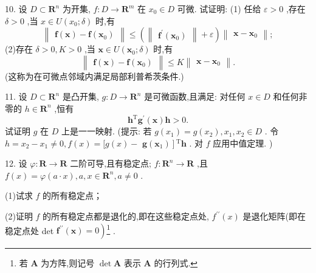 10. 设 \(D \subset  {\mathbf{R}}^{n}\) 为开集, \(f : D \rightarrow  {\mathbf{R}}^{m}\) 在 \({x}_{0} \in  D\) 可微. 试证明: (1) 任给 \(\varepsilon  > 0\) ,存在 \(\delta  > 0\) ,当 \(x \in  U\left( {{x}_{0};\delta }\right)\) 时,有
\[
\begin{Vmatrix}{\mathbf{f}\left( \mathbf{x}\right)  - \mathbf{f}\left( {\mathbf{x}}_{0}\right) }\end{Vmatrix} \leq  \left( {\begin{Vmatrix}{{\mathbf{f}}^{\prime }\left( {\mathbf{x}}_{0}\right) }\end{Vmatrix} + \varepsilon }\right) \begin{Vmatrix}{\mathbf{x} - {\mathbf{x}}_{0}}\end{Vmatrix};
\]
(2)存在 \(\delta  > 0,K > 0\) ,当 \(\mathbf{x} \in  U\left( {{\mathbf{x}}_{0};\delta }\right)\) 时,有
\[
\begin{Vmatrix}{\mathbf{f}\left( \mathbf{x}\right)  - \mathbf{f}\left( {\mathbf{x}}_{0}\right) }\end{Vmatrix} \leq  K\begin{Vmatrix}{\mathbf{x} - {\mathbf{x}}_{0}}\end{Vmatrix}.
\]
(这称为在可微点邻域内满足局部利普希茨条件.)

11. 设 \(D \subset  {\mathbf{R}}^{n}\) 是凸开集, \(g : D \rightarrow  {\mathbf{R}}^{n}\) 是可微函数,且满足: 对任何 \(x \in  D\) 和任何非零的 \(h \in  {\mathbf{R}}^{n}\) ,恒有
\[
{\mathbf{h}}^{\mathrm{T}}{\mathbf{g}}^{\prime }\left( \mathbf{x}\right) \mathbf{h} > 0.
\]
试证明 \(g\) 在 \(D\) 上是一一映射. (提示: 若 \(g\left( {x}_{1}\right)  = g\left( {x}_{2}\right) ,{x}_{1},{x}_{2} \in  D\) . 令 \(h = {x}_{2} - {x}_{1} \neq  0,f\left( x\right)  = \lbrack g\left( x\right)  -\)  \(\left. {\mathbf{g}\left( {\mathbf{x}}_{1}\right) }\right\rbrack  {}^{\mathrm{T}}\mathbf{h}\) . 对 \(f\) 应用中值定理. )

12. 设 \(\varphi  : \mathbf{R} \rightarrow  \mathbf{R}\) 二阶可导,且有稳定点; \(f : {\mathbf{R}}^{n} \rightarrow  \mathbf{R}\) ,且 \(f\left( x\right)  = \varphi \left( {a \cdot  x}\right) ,a,x \in  {\mathbf{R}}^{n},a \neq  0\) .

(1)试求 \(f\) 的所有稳定点；

(2)证明 \(f\) 的所有稳定点都是退化的,即在这些稳定点处, \({f}^{\prime \prime }\left( x\right)\) 是退化矩阵(即在稳定点处 det \(\left. {{\mathbf{f}}^{\prime \prime }\left( \mathbf{x}\right)  = 0}\right)\)\footnote{若 \(\mathbf{A}\) 为方阵,则记号 \(\det \mathbf{A}\) 表示 \(\mathbf{A}\) 的行列式.} .

